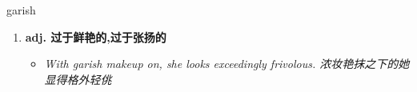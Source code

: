 
\begin{frame}
{\huge garish}
\begin{center}
\begin{enumerate}\Large
  \item \textbf{adj. 过于鲜艳的,过于张扬的}
  \begin{itemize}
    \item \em{\Large{With garish makeup on, she looks exceedingly frivolous. 浓妆艳抹之下的她显得格外轻佻}}
  \end{itemize}
\end{enumerate}
\end{center}
\end{frame}
